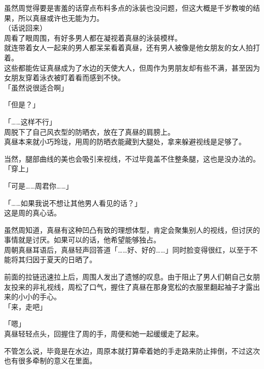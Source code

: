 虽然周觉得要是害羞的话穿点布料多点的泳装也没问题，但这大概是千岁教唆的结果，所以真昼或许也无能为力。\\

（话说回来）\\

周看了眼周围，有好多男人都在凝视着真昼的泳装模样。\\

就连带着女人一起来的男人都呆呆看着真昼，还有男人被像是他女朋友的女人拍打着。\\

这些都能佐证真昼成为了水边的天使大人，但周作为男朋友却有些不满，甚至因为女朋友穿着泳衣被盯着看而感到不快。\\

「虽然说很适合啊」

「但是？」

「……这样不行」\\

周脱下了自己风衣型的防晒衣，放在了真昼的肩膀上。\\

真昼本来就小巧玲珑，用周的防晒衣能藏到大腿处，拿来躲避视线是足够了。

当然，腿部曲线的美也会吸引来视线，不过毕竟盖不住整条腿，这也是没办法的。\\

「穿上」

「可是……周君你……」

「……如果我说不想让其他男人看见的话？」\\

这是周的真心话。

虽然周知道，真昼有这种凹凸有致的理想体型，肯定会聚集别人的视线，但讨厌的事情就是讨厌。如果可以的话，他希望能够独占。\\

周朝真昼耳语后，真昼轻声回答道「……好、好的……」同时脸变得很红，以至于不能将其归因于夏天的日晒了。

前面的拉链迅速拉上后，周围人发出了遗憾的叹息。由于阻止了男人们朝自己女朋友投来的非礼视线，周松了口气，握住了真昼在那身宽松的衣服里翻起袖子才露出来的小小的手心。\\

「来，走吧」

「嗯」\\

真昼轻轻点头，回握住了周的手，周便和她一起缓缓走了起来。

不管怎么说，毕竟是在水边，周原本就打算牵着她的手走路来防止摔倒，不过这次也有很多牵制的意义在里面。\\

